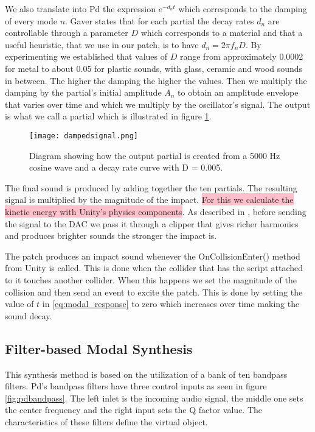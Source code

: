We also translate into Pd the expression $e^{-d_n t}$ which corresponds to the damping of every mode $n$. Gaver \cite{gaver1993we} states that for each partial the decay rates $d_n$ are controllable through a parameter $D$ which corresponds to a material and that a useful heuristic, that we use in our patch, is to have $d_n = 2 \pi f_nD$. By experimenting we established that values of $D$ range from approximately 0.0002 for metal to about 0.05 for plastic sounds, with glass, ceramic and wood sounds in between. The higher the damping the higher the values. Then we multiply the damping by the partial's initial amplitude $A_n$ to obtain an amplitude envelope that varies over time and which we multiply by the oscillator's signal. The output is what we call a partial which is illustrated in figure \ref{fig:dampedsignal}. 

\begin{figure}[H]
  \centering
    \texttt{[image: dampedsignal.png]}
      \caption{Diagram showing how the output partial is created from a 5000 Hz cosine wave and a decay rate curve with D = 0.005.}
      \label{fig:dampedsignal}
\end{figure}

The final sound is produced by adding together the ten partials. The resulting signal is multiplied by the magnitude of the impact. \colorbox{pink}{For this we calculate the kinetic energy with Unity's physics components}. As described in \cite{farnell2010designing}, before sending the signal to the DAC we pass it through a clipper that gives richer harmonics and produces brighter sounds the stronger the impact is.

The patch produces an impact sound whenever the OnCollisionEnter() method from Unity is called. This is done when the collider that has the script attached to it touches another collider. When this happens we set the magnitude of the collision and then send an event to excite the patch. This is done by setting the value of $t$ in \ref{eq:modal_response} to zero which increases over time making the sound decay.

\subsection{Filter-based Modal Synthesis}

This synthesis method is based on the utilization of a bank of ten bandpass filters. Pd's bandpass filters have three control inputs as seen in figure \ref{fig:pdbandpass}. The left inlet is the incoming audio signal, the middle one sets the center frequency and the right input sets the Q factor value. The characteristics of these filters define the virtual object.

